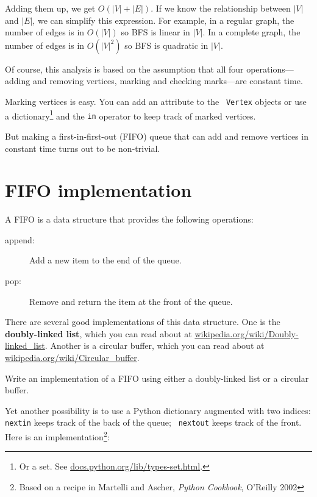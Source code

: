 \documentclass[10pt]{book}
\begin{document}
Adding them up, we get $O(|V| + |E|)$.  If we know the relationship
between $|V|$ and $|E|$, we can simplify this expression.  For
example, in a regular graph, the number of edges is in $O(|V|)$ so BFS
is linear in $|V|$.  In a complete graph, the number of edges is in
$O(|V|^2)$ so BFS is quadratic in $|V|$.

Of course, this analysis is based on the assumption that all four
operations---adding and removing vertices, marking and checking
marks---are constant time.

Marking vertices is easy.  You can add an attribute to the {\tt
  Vertex} objects or use a dictionary\footnote{Or a set.  See
  \url{docs.python.org/lib/types-set.html}.} and the {\tt in} operator
to keep track of marked vertices.

But making a first-in-first-out (FIFO) queue that can add and remove
vertices in constant time turns out to be non-trivial.


\section{FIFO implementation}

A FIFO is a data structure that provides the following operations:

\begin{description}

\item[append:] Add a new item to the end of the queue.

\item[pop:] Remove and return the item at the front of the queue.

\end{description}

There are several good implementations of this data structure.
One is the {\bf doubly-linked list}, which 
you can read about at \url{wikipedia.org/wiki/Doubly-linked_list}.
Another is a circular buffer, which you can read about at
\url{wikipedia.org/wiki/Circular_buffer}.

\begin{ex}

Write an implementation of a FIFO using either a doubly-linked
list or a circular buffer.

\end{ex}

Yet another possibility is to use a Python dictionary augmented with
two indices: {\tt nextin} keeps track of the back of the queue; {\tt
  nextout} keeps track of the front.  Here is an
implementation\footnote{Based on a recipe in Martelli and Ascher, {\em
    Python Cookbook}, O'Reilly 2002}:
\end{document}
